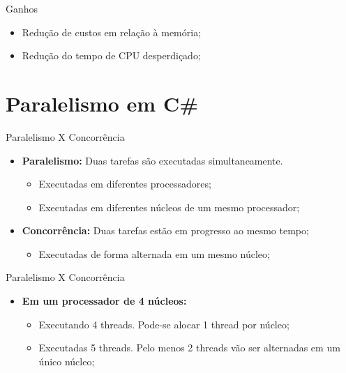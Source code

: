 \documentclass[10pt]{beamer}
\begin{document}
\begin{frame}{Ganhos}
	\begin{itemize}
		\item Redução de custos em relação à memória;
		\vspace{0.2cm}
		\item Redução do tempo de CPU desperdiçado;
	\end{itemize}
\end{frame}

\section{Paralelismo em C\#}

\begin{frame}{Paralelismo X Concorrência}
	\begin{itemize}
		\item \textbf{Paralelismo:} Duas tarefas são executadas simultaneamente.
		\begin{itemize}
			\item Executadas em diferentes processadores;
			\item Executadas em diferentes núcleos de um mesmo processador;
		\end{itemize}
		\vspace{0.2cm}
		\item \textbf{Concorrência:} Duas tarefas estão em progresso ao mesmo tempo;
		\begin{itemize}
			\item Executadas de forma alternada em um mesmo núcleo;
		\end{itemize}
	\end{itemize}
\end{frame}

\begin{frame}{Paralelismo X Concorrência}
	\begin{itemize}
		\item \textbf{Em um processador de 4 núcleos:}
		\begin{itemize}
			\item Executando 4 threads. Pode-se alocar 1 thread por núcleo;
			\vspace{0.2cm}
			\item Executadas 5 threads. Pelo menos 2 threads vão ser alternadas em um único núcleo;
		\end{itemize}
	\end{itemize}
\end{frame}
\end{document}

